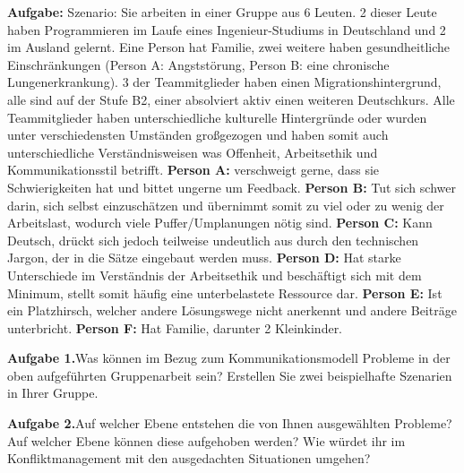 \documentclass[a4paper]{article}
\begin{document}
\begin{flushleft}

\textbf{Aufgabe:}\newline \newline
Szenario: Sie arbeiten in einer Gruppe aus 6 Leuten. 2 dieser Leute haben Programmieren im Laufe eines Ingenieur-Studiums in Deutschland und 2 im Ausland gelernt. Eine Person hat Familie, zwei weitere haben gesundheitliche Einschränkungen (Person A: Angststörung, Person B: eine chronische Lungenerkrankung). 3 der Teammitglieder haben einen Migrationshintergrund, alle sind auf der Stufe B2, einer absolviert aktiv einen weiteren Deutschkurs. Alle Teammitglieder haben unterschiedliche kulturelle Hintergründe oder wurden unter verschiedensten Umständen großgezogen und haben somit auch unterschiedliche Verständnisweisen was Offenheit, Arbeitsethik und Kommunikationsstil betrifft. \newline \newline \textbf{Person A:} verschweigt gerne, dass sie Schwierigkeiten hat und bittet ungerne um Feedback. \newline \textbf{Person B:} Tut sich schwer darin, sich selbst einzuschätzen und übernimmt somit zu viel oder zu wenig der Arbeitslast, wodurch viele Puffer/Umplanungen nötig sind. \newline \textbf{Person C:} Kann Deutsch, drückt sich jedoch teilweise undeutlich aus durch den technischen Jargon, der in die Sätze eingebaut werden muss. \newline \textbf{Person D:} Hat starke Unterschiede im Verständnis der Arbeitsethik und beschäftigt sich mit dem Minimum, stellt somit häufig eine unterbelastete Ressource dar. \newline \textbf{Person E:} Ist ein Platzhirsch, welcher andere Lösungswege nicht anerkennt und andere Beiträge unterbricht. \newline \textbf{Person F:} Hat Familie, darunter 2 Kleinkinder.\newline \newline


\textbf{Aufgabe 1.}\newline Was können im Bezug zum Kommunikationsmodell Probleme in der oben aufgeführten Gruppenarbeit sein? Erstellen Sie zwei beispielhafte Szenarien in Ihrer Gruppe.\newline

\textbf{Aufgabe 2.}\newline Auf welcher Ebene entstehen die von Ihnen ausgewählten Probleme? Auf welcher Ebene können diese aufgehoben werden? Wie würdet ihr im Konfliktmanagement mit den ausgedachten Situationen umgehen?\newline


\end{flushleft}
\end{document}
